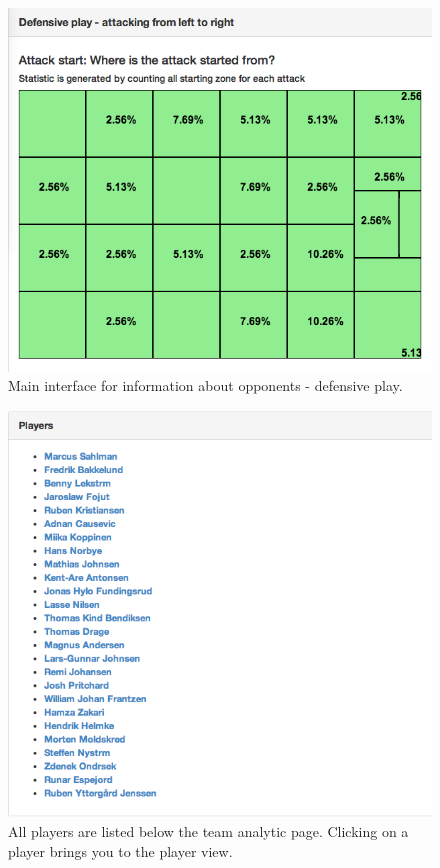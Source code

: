 \begin{figure}[H]
\centering
\includegraphics[width=1\textwidth]{images/general/team_analysis3.png}
\caption{Main interface for information about opponents - defensive play.}
\label{fig:team_analysis3}
\end{figure}

\begin{figure}[H]
\centering
\includegraphics[width=1\textwidth]{images/general/team_analysis4.png}
\caption{All players are listed below the team analytic page. Clicking on a player brings you to the player view.}
\label{fig:team_analysis4}
\end{figure}

